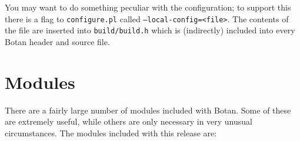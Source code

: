 \documentclass{article}
\newcommand{\filename}[1]{\texttt{#1}}
\begin{document}
You may want to do something peculiar with the configuration; to
support this there is a flag to \filename{configure.pl} called
\texttt{--local-config=<file>}. The contents of the file are inserted into
\filename{build/build.h} which is (indirectly) included into every
Botan header and source file.

\pagebreak

\section{Modules}

There are a fairly large number of modules included with Botan. Some
of these are extremely useful, while others are only necessary in very
unusual circumstances. The modules included with this release are:

\newcommand{\mod}[2]{\textbf{#1}: #2}
\end{document}
